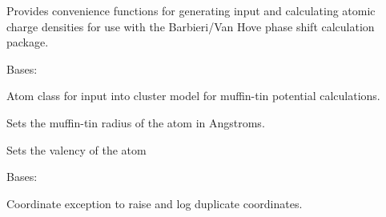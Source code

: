 \documentclass[letterpaper,10pt,english]{sphinxmanual}
\begin{document}
Provides convenience functions for generating input and calculating 
atomic charge densities for use with the Barbieri/Van Hove phase 
shift calculation package.

\begin{fulllineitems}
\label{modules:phaseshifts.model.Atom}
Bases: 

Atom class for input into cluster model for muffin-tin potential
calculations.

\begin{fulllineitems}
\label{modules:phaseshifts.model.Atom.set_coordinates}
\end{fulllineitems}


\begin{fulllineitems}
\label{modules:phaseshifts.model.Atom.set_mufftin_radius}
Sets the muffin-tin radius of the atom in Angstroms.

\end{fulllineitems}


\begin{fulllineitems}
\label{modules:phaseshifts.model.Atom.set_valence}
Sets the valency of the atom

\end{fulllineitems}


\end{fulllineitems}


\begin{fulllineitems}
\label{modules:phaseshifts.model.CoordinatesError}
Bases: \href{http://docs.python.org/library/exceptions.html\#exceptions.Exception}{}

Coordinate exception to raise and log duplicate coordinates.

\end{fulllineitems}
\end{document}
